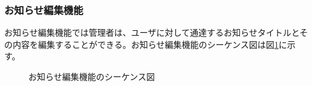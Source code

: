 \documentclass[a4j]{jarticle}
\begin{document}
 \subsubsection{お知らせ編集機能}
 お知らせ編集機能では管理者は、ユーザに対して通達するお知らせタイトルとその内容を編集することができる。お知らせ編集機能のシーケンス図は図\ref{fig:admin_news.png}に示す。
            \begin{figure}[H]
\centering
{}
\caption{お知らせ編集機能のシーケンス図}
\label{fig:admin_news.png}
\end{figure}
\end{document}
